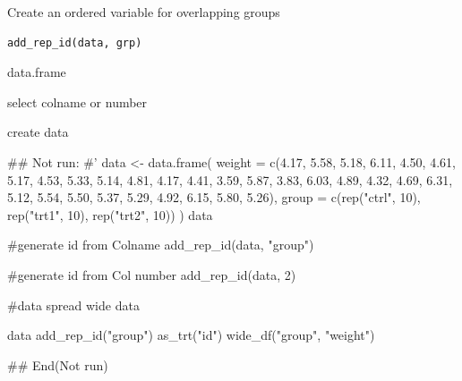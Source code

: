 \documentclass[a4paper]{book}
\begin{document}
%
\begin{Description}
Create an ordered variable for overlapping groups
\end{Description}
%
\begin{Usage}
\begin{verbatim}
add_rep_id(data, grp)
\end{verbatim}
\end{Usage}
%
\begin{Arguments}
\begin{ldescription}
\item[\code{data}] data.frame

\item[\code{grp}] select colname or number
\end{ldescription}
\end{Arguments}
%
\begin{Value}
create data
\end{Value}
%
\begin{Examples}
\begin{ExampleCode}

\#\# Not run: 
#'
data <- data.frame(
  weight = c(4.17, 5.58, 5.18, 6.11, 4.50, 4.61, 5.17, 4.53, 5.33, 5.14,
             4.81, 4.17, 4.41, 3.59, 5.87, 3.83, 6.03, 4.89, 4.32, 4.69,
             6.31, 5.12, 5.54, 5.50, 5.37, 5.29, 4.92, 6.15, 5.80, 5.26),
  group = c(rep("ctrl", 10), rep("trt1", 10), rep("trt2", 10))
)
data

#generate id from Colname
add_rep_id(data, "group")

#generate id from Col number
add_rep_id(data, 2)

#data spread wide
data%


data%
  add_rep_id("group")%
  as_trt("id") %
  wide_df("group", "weight")


## End(Not run)


\end{ExampleCode}
\end{Examples}
\end{document}
